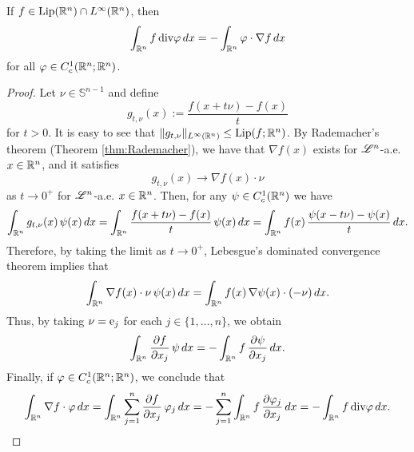 \begin{proposition} \label{prop:weak_der_Lip_b}
If $f \in \operatorname{Lip}(\mathbb{R}^{n}) \cap L^{\infty}(\mathbb{R}^{n})$, then
\begin{equation} \label{eq:weak_der_Lip_b}
\int_{\mathbb{R}^{n}} f \, \mathrm{div} \varphi \, dx = - \int_{\mathbb{R}^{n}} \varphi \cdot \nabla f \, dx
\end{equation}
for all $\varphi \in C^{1}_{c}(\mathbb{R}^{n}; \mathbb{R}^{n})$.
\end{proposition}
\begin{proof}
Let $\nu \in \mathbb{S}^{n - 1}$ and define
\begin{equation*}
g_{t, \nu}(x) := \frac{f(x + t \nu) -f(x)}{t}
\end{equation*}
for $t > 0$. It is easy to see that $\|g_{t, \nu}\|_{L^{\infty}(\mathbb{R}^{n})} \le \operatorname{Lip}(f; \mathbb{R}^{n})$.
By Rademacher's theorem (Theorem \ref{thm:Rademacher}), we have that $\nabla f(x)$ exists for $\mathscr{L}^{n}$-a.e. $x \in \mathbb{R}^{n}$, and it satisfies
\begin{equation*}
g_{t, \nu}(x) \to \nabla f(x) \cdot \nu
\end{equation*}
as $t \to 0^{+}$ for $\mathscr{L}^{n}$-a.e. $x \in \mathbb{R}^{n}$. Then, for any $\psi \in C^{1}_{c}(\mathbb{R}^{n})$ we have
\begin{equation*}
\int_{\mathbb{R}^{n}} g_{t, \nu}(x) \, \psi(x) \, dx = \int_{\mathbb{R}^{n}} \frac{f(x + t\nu) -f(x)}{t} \, \psi(x) \, dx = \int_{\mathbb{R}^{n}} f(x) \, \frac{\psi(x - t \nu) - \psi(x)}{t} \, dx.
\end{equation*}
Therefore, by taking the limit as $t \to 0^{+}$, Lebesgue's dominated convergence theorem implies that
\begin{equation*}
\int_{\mathbb{R}^{n}} \nabla f(x) \cdot \nu \, \psi(x) \, dx = \int_{\mathbb{R}^{n}} f(x) \, \nabla \psi(x) \cdot (- \nu) \, dx.
\end{equation*}
Thus, by taking $\nu = {\rm e}_{j}$ for each $j \in \{1, \dots, n\}$, we obtain
\begin{equation*}
\int_{\mathbb{R}^{n}} \frac{\partial f}{\partial x_{j}} \, \psi \,dx = - \int_{\mathbb{R}^{n}} f \, \frac{\partial \psi}{\partial x_{j}} \, dx.
\end{equation*}
Finally, if $\varphi \in C^{1}_{c}(\mathbb{R}^{n}; \mathbb{R}^{n})$, we conclude that
\begin{equation*}
\int_{\mathbb{R}^{n}} \nabla f \cdot \varphi \, dx = \int_{\mathbb{R}^{n}} \sum_{j = 1}^{n} \frac{\partial f}{\partial x_{j}} \, \varphi_{j} \,dx = - \sum_{j = 1}^{n} \int_{\mathbb{R}^{n}} f \, \frac{\partial \varphi_{j}}{\partial x_{j}} \, dx = - \int_{\mathbb{R}^{n}} f  \, \mathrm{div} \varphi \, dx.
\end{equation*}
\end{proof}



